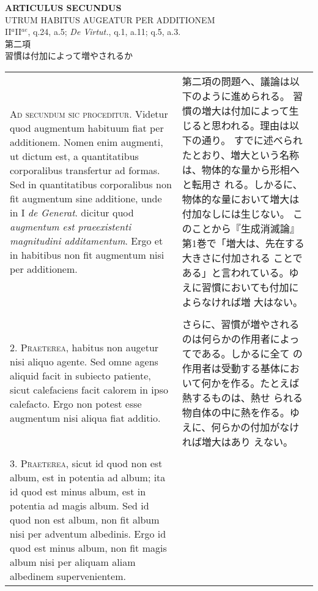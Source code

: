 \documentclass[10pt]{jsarticle} %
\begin{document}
\begin{center}
{\Large {\bf ARTICULUS SECUNDUS}}\\
{\large UTRUM HABITUS AUGEATUR PER ADDITIONEM}\\
{\footnotesize II$^{a}$II$^{ae}$, q.24, a.5; {\itshape De Virtut.},
 q.1, a.11; q.5, a.3.}\\
{\Large 第二項\\習慣は付加によって増やされるか}
\end{center}

\begin{longtable}{p{21em}p{21em}}


{\scshape Ad secundum sic proceditur}. Videtur quod augmentum habituum fiat per
additionem. Nomen enim augmenti, ut dictum est, a quantitatibus
corporalibus transfertur ad formas. Sed in quantitatibus corporalibus
non fit augmentum sine additione, unde in I {\itshape de Generat}. dicitur quod
{\itshape augmentum est praeexistenti magnitudini additamentum}. Ergo et in
habitibus non fit augmentum nisi per additionem.


&

第二項の問題へ、議論は以下のように進められる。
習慣の増大は付加によって生じると思われる。理由は以下の通り。
すでに述べられたとおり、増大という名称は、物体的な量から形相へと転用さ
 れる。しかるに、物体的な量において増大は付加なしには生じない。
このことから『生成消滅論』第1巻で「増大は、先在する大きさに付加される
 ことである」と言われている。ゆえに習慣においても付加によらなければ増
 大はない。

\\\\



2. {\scshape Praeterea}, habitus non augetur nisi aliquo agente. Sed omne agens
aliquid facit in subiecto patiente, sicut calefaciens facit calorem in
ipso calefacto. Ergo non potest esse augmentum nisi aliqua fiat
additio.


&

さらに、習慣が増やされるのは何らかの作用者によってである。しかるに全て
 の作用者は受動する基体において何かを作る。たとえば熱するものは、熱せ
 られる物自体の中に熱を作る。ゆえに、何らかの付加がなければ増大はあり
 えない。

\\\\



3. {\scshape Praeterea}, sicut id quod non est album, est in potentia ad album; ita
id quod est minus album, est in potentia ad magis album. Sed id quod
non est album, non fit album nisi per adventum albedinis. Ergo id quod
est minus album, non fit magis album nisi per aliquam aliam albedinem
supervenientem.



\end{longtable}
\end{document}
